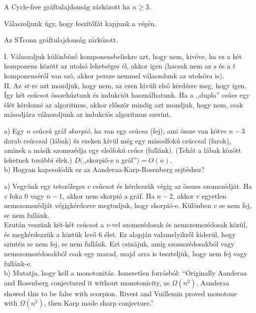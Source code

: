 \begin{Exercise}[counter={sorszam}, difficulty=0]
	A {\sc Cycle-free} gráftulajdonság zárkózott ha $n\ge 3$.
\end{Exercise}
\begin{Answer}
	V\'alaszoljunk \'ugy, hogy fesz\'it\H of\'at kapjunk a v\'eg\'en.
\end{Answer}

\begin{Exercise}[counter={sorszam}, difficulty=0]
	Az {\sc STconn} gráftulajdonság zárkózott.
\end{Exercise}	
\begin{Answer}
	I. V\'alaszoljuk k\"ul\"onb\"oz\H o komponensbeliekre azt, hogy nem, kiv\'eve, ha ez a k\'et komponens k\"oz\"ott az utols\'o lehets\'eges \'el, akkor igen (hacsak nem az $s$ \'es a $t$ komponens\'er\H ol van sz\'o, akkor persze nemmel v\'alaszolunk az utols\'ora is).\\
	II. Az $st$-re azt mondjuk, hogy nem, az ezen k\'iv\"uli els\H o k\'erd\'esre meg, hogy igen. \'Igy k\'et cs\'ucsot \"osszeh\'uztunk \'es indukci\'ot haszn\'alhatunk. Ha a ,,dupla'' cs\'ucs egy \'el\'et k\'erdezn\'e az algoritmus, akkor el\H osz\"or mindig azt mondjuk, hogy nem, csak m\'asodj\'ara v\'alaszoljunk az indukci\'os algoritmus szerint.
\end{Answer}

\begin{Exercise}[counter={sorszam}, difficulty=0]
	a) Egy $n$ csúcsú gráf {\em skorpió}, ha van egy csúcsa (fej), ami össze van kötve $n-3$ darab csúccsal (lábak) és ezeken k\'iv\"ul m\'eg egy másodfokú csúccsal (farok), aminek a másik szomszédja egy els\H ofokú csúcs (fullánk). (Teh\'at a l\'abak k\"oz\"ott lehetnek tov\'abbi \'elek.) $D($,,skorpió-e a gráf''$)=O(n).$ \\
	b) Hogyan kapcsol\'odik ez az Aanderaa-Karp-Rosenberg sejt\'eshez?
\end{Exercise}
\begin{Answer}
	a) Vegy\"unk egy tetsz\H oleges $v$ cs\'ucsot \'es k\'erdezz\"uk v\'egig az \"osszes szomsz\'edj\'at. Ha $v$ foka 0 vagy $n-1$, akkor nem skorpi\'o a gr\'af. Ha $n-2$, akkor $v$ egyetlen nemszomsz\'edj\'at v\'egigk\'erdezve megtudjuk, hogy skorpi\'o-e. K\"ul\"onben $v$ se nem fej, se nem full\'ank.\\
	Ezut\'an vesz\"unk k\'et-k\'et cs\'ucsot a $v$-vel szomsz\'edosak \'es nemszomsz\'edosak k\"oz\"ul, \'es megk\'erdezz\"uk a k\"ozt\"uk lev\H o 6 \'elet. Ez alapj\'an valamelyikr\H ol kider\"ul, hogy szint\'en se nem fej, se nem full\'ank. Ezt csin\'ajuk, am\'ig szomsz\'edosakb\'ol vagy nemszomsz\'edosakb\'ol csak egy marad, majd arra is tesztelj\"uk, hogy nem fej vagy full\'ank-e.\\
	b) Mutatja, hogy kell a monotonit\'as.
	Ismeretlen forr\'asb\'ol: ``Originally Aanderaa and Rosenberg conjectured it without monotonicity, as $\Omega(n^2)$, Aanderaa showed this to be false with scorpion. Rivest and Vuillemin proved monotone with $\Omega(n^2)$, then Karp made sharp conjecture.''
\end{Answer}

